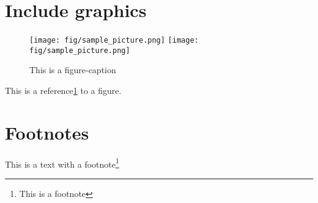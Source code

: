 \documentclass[10pt,a4paper]{article}
\begin{document}
\section*{Include graphics}
\begin{figure}[H]
\centering	%
\texttt{[image: fig/sample\_picture.png]}
\texttt{[image: fig/sample\_picture.png]}
\caption{This is a figure-caption}
\label{fig:figure1}
\end{figure}
This is a reference\ref{fig:figure1} to a figure.




\section*{Footnotes}
This is a text with a footnote\footnote{This is a footnote}



\newpage    %
\pagebreak  %
\vfill      %
\vspace{1cm}    %
\hspace{1cm}    %
\end{document}
